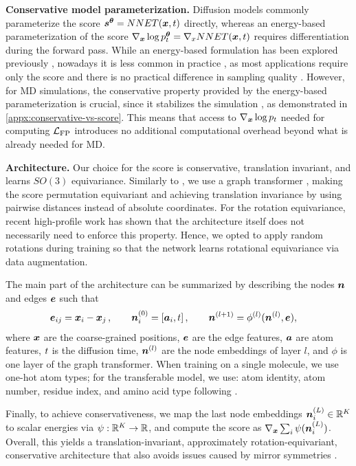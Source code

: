 \textbf{Conservative model parameterization.}
Diffusion models commonly parameterize the score ${{\bm{s}}^{\bm{\theta}}} = NNET({{\bm{x}}}, {t})$ directly, whereas an energy-based parameterization of the score $\nabla_{{\bm{x}}} \log p^{\bm{\theta}}_{t} = \nabla_x NNET({{\bm{x}}}, {t})$ requires differentiation during the forward pass. While an energy-based formulation has been explored previously \citep{song2019generative}, nowadays it is less common in practice \citep{du2023recycle}, as most applications require only the score and there is no practical difference in sampling quality \citep{salimans2021escore}. 
However, for \gls{MD} simulations, the conservative property provided by the energy-based parameterization is crucial, since it stabilizes the simulation \citep{arts2023}, as demonstrated in \cref{appx:conservative-vs-score}. This means that access to $\nabla_{{\bm{x}}} \log p_{t}$ needed for computing $\mathcal{L}_{\text{FP}}$ introduces no additional computational overhead beyond what is already needed for \gls{MD}.

\textbf{Architecture.}
Our choice for the score is conservative, translation invariant, and learns $SO(3)$ equivariance. Similarly to \cite{arts2023}, we use a graph transformer \citep{shi2021}, making the score permutation equivariant and achieving translation invariance by using pairwise distances instead of absolute coordinates. For the rotation equivariance, recent high-profile work \citep{abramson2024alphafold3} has shown that the architecture itself does not necessarily need to enforce this property. Hence, we opted to apply random rotations during training so that the network learns rotational equivariance via data augmentation. 

The main part of the architecture can be summarized by describing the nodes ${\bm{n}}$ and edges ${\bm{e}}$ such that
\begin{align}
    &{\bm{e}}_{ij} = {{\bm{x}}}_i - {{\bm{x}}}_j \,,  \qquad
    {\bm{n}}^{(0)}_i = [{\bm{a}}_i, {t}] \,,  \qquad
    {\bm{n}}^{(l+1)} = \phi^{(l)}({\bm{n}}^{(l)}, {\bm{e}}) ,
\end{align}
where ${{\bm{x}}}$ are the coarse-grained positions, ${\bm{e}}$ are the edge features, ${\bm{a}}$ are atom features, ${t}$ is the diffusion time, ${\bm{n}}^{(l)}$ are the node embeddings of layer $l$, and $\phi$ is one layer of the graph transformer. When training on a single molecule, we use one-hot atom types; for the transferable model, we use: atom identity, atom number, residue index, and amino acid type following \cite{klein2024tbg}.

Finally, to achieve conservativeness, we map the last node embeddings ${\bm{n}}^{(L)}_i \in \mathbb{R}^K$ to scalar energies via $\psi: \mathbb{R}^K \to \mathbb{R}$, and compute the score as $\nabla_{{\bm{x}}} \sum_i \psi({\bm{n}}^{(L)}_i)$. Overall, this yields a translation-invariant, approximately rotation-equivariant, conservative architecture that also avoids issues caused by mirror symmetries \citep{trippe2023diffusion, klein2024tbg}.

